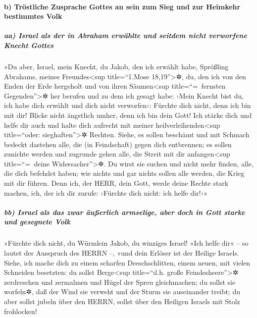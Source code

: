 \hypertarget{b-truxf6stliche-zusprache-gottes-an-sein-zum-sieg-und-zur-heimkehr-bestimmtes-volk}{%
\paragraph{b) Tröstliche Zusprache Gottes an sein zum Sieg und zur
Heimkehr bestimmtes
Volk}\label{b-truxf6stliche-zusprache-gottes-an-sein-zum-sieg-und-zur-heimkehr-bestimmtes-volk}}

\hypertarget{aa-israel-als-der-in-abraham-erwuxe4hlte-und-seitdem-nicht-verworfene-knecht-gottes}{%
\subparagraph{aa) Israel als der in Abraham erwählte und seitdem nicht
verworfene Knecht
Gottes}\label{aa-israel-als-der-in-abraham-erwuxe4hlte-und-seitdem-nicht-verworfene-knecht-gottes}}

»Du aber, Israel, mein Knecht, du Jakob, den ich erwählt
habe, Sprößling Abrahams, meines Freundes\textless sup title=``1.Mose
18,19''\textgreater✲, du, den ich von den Enden der Erde
hergeholt und von ihren Säumen\textless sup title=``=~fernsten
Gegenden''\textgreater✲ her berufen und zu dem ich gesagt habe: ›Mein
Knecht bist du, ich habe dich erwählt und dich nicht verworfen‹:
Fürchte dich nicht, denn ich bin mit dir! Blicke nicht
ängstlich umher, denn ich bin dein Gott! Ich stärke dich und helfe dir
auch und halte dich aufrecht mit meiner heilverleihenden\textless sup
title=``oder: sieghaften''\textgreater✲ Rechten. Siehe,
es sollen beschämt und mit Schmach bedeckt dastehen alle, die (in
Feindschaft) gegen dich entbrennen; es sollen zunichte werden und
zugrunde gehen alle, die Streit mit dir anfangen\textless sup
title=``=~deine Widersacher''\textgreater✲. Du wirst sie
suchen und nicht mehr finden, alle, die dich befehdet haben; wie nichts
und gar nichts sollen alle werden, die Krieg mit dir führen.
Denn ich, der HERR, dein Gott, werde deine Rechte stark
machen, ich, der ich dir zurufe: ›Fürchte dich nicht: ich helfe dir!‹«

\hypertarget{bb-israel-als-das-zwar-uxe4uuxdferlich-armselige-aber-doch-in-gott-starke-und-gesegnete-volk}{%
\subparagraph{bb) Israel als das zwar äußerlich armselige, aber doch in
Gott starke und gesegnete
Volk}\label{bb-israel-als-das-zwar-uxe4uuxdferlich-armselige-aber-doch-in-gott-starke-und-gesegnete-volk}}

»Fürchte dich nicht, du Würmlein Jakob, du winziges
Israel! »Ich helfe dir« -- so lautet der Ausspruch des HERRN --, »und
dein Erlöser ist der Heilige Israels. Siehe, ich mache
dich zu einem scharfen Dreschschlitten, einem neuen, mit vielen
Schneiden besetzten: du sollst Berge\textless sup title=``d.h. große
Feindesheere''\textgreater✲ zerdreschen und zermalmen und Hügel der
Spreu gleichmachen; du sollst sie worfeln✲, daß der Wind
sie verweht und der Sturm sie auseinander treibt; du aber sollst jubeln
über den HERRN, sollst über den Heiligen Israels mit Stolz frohlocken!

